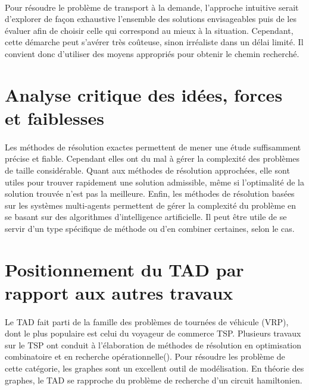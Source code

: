\documentclass{article}
\begin{document}
\paragraph{}
Pour résoudre le problème de transport à la demande, l'approche intuitive serait d'explorer de façon exhaustive l'ensemble des solutions envisageables puis de les évaluer afin de choisir celle qui correspond au mieux à la situation. Cependant, cette démarche peut s'avérer très coûteuse, sinon irréaliste dans un délai limité. Il convient donc d'utiliser des moyens appropriés pour obtenir le chemin recherché.


\section{Analyse critique des idées, forces et faiblesses}

\paragraph{}
Les méthodes de résolution exactes permettent de mener une étude suffisamment précise et fiable. Cependant elles ont du mal à gérer la complexité des problèmes de taille considérable. Quant aux méthodes de résolution approchées, elle sont utiles pour trouver rapidement une solution admissible, même si l'optimalité de la solution trouvée n'est pas la meilleure. Enfin, les méthodes de résolution basées sur les systèmes multi-agents permettent de gérer la complexité du problème en se basant sur des algorithmes d'intelligence artificielle. Il peut être utile de se servir d'un type spécifique de méthode ou d'en combiner certaines, selon le cas.

\section{Positionnement du TAD par rapport aux autres travaux}

\paragraph{}
Le TAD fait parti de la famille des problèmes de tournées de véhicule (VRP), dont le plus populaire est celui du voyageur de commerce TSP. Plusieurs travaux sur le TSP ont conduit à l'élaboration de méthodes de résolution en optimisation combinatoire et en recherche opérationnelle(\cite{Nobody06}). Pour résoudre les problème de cette catégorie, les graphes sont un excellent outil de modélisation. En théorie des graphes, le TAD se rapproche du problème de recherche d'un circuit hamiltonien.
\end{document}
